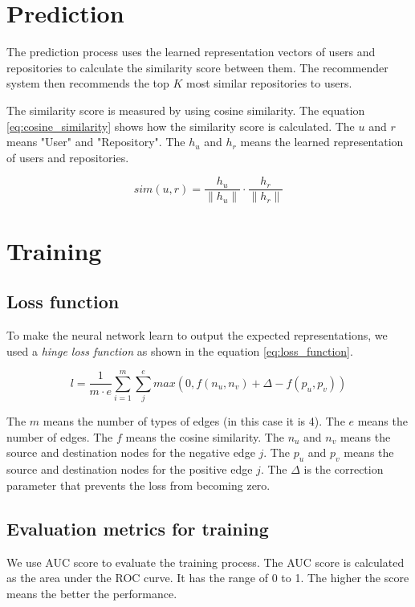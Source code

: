 \documentclass[11pt,twoside]{report}
\begin{document}
\section{Prediction}
The prediction process uses the learned representation vectors of users and repositories to calculate the similarity score between them. The recommender system then recommends the top $K$ most similar repositories to users.

The similarity score is measured by using cosine similarity. The equation \ref{eq:cosine_similarity} shows how the similarity score is calculated. The $u$ and $r$ means "User" and "Repository". The $h_u$ and $h_r$ means the learned representation of users and repositories.

\begin{equation}
    sim(u, r) = \frac{h_u}{\|h_u\|}\cdot\frac{h_r}{\|h_r\|}
    \label{eq:cosine_similarity}
\end{equation}

\section{Training}
\subsection{Loss function}
To make the neural network learn to output the expected representations, we used a \textit{hinge loss function} as shown in the equation \ref{eq:loss_function}.

\begin{equation}
    l=\frac{1}{m\cdot{e}}\sum_{i=1}^{m}\sum_{j}^{e} max(0, f(n_u, n_v)+\Delta-f(p_u, p_v))
    \label{eq:loss_function}
\end{equation}

The $m$ means the number of types of edges (in this case it is 4). The $e$ means the number of edges. The $f$ means the cosine similarity. The $n_u$ and $n_v$ means the source and destination nodes for the negative edge $j$. The $p_u$ and $p_v$ means the source and destination nodes for the positive edge $j$. The $\Delta$ is the correction parameter that prevents the loss from becoming zero.

\subsection{Evaluation metrics for training}
We use AUC score to evaluate the training process. The AUC score is calculated as the area under the ROC curve. It has the range of 0 to 1. The higher the score means the better the performance.
\end{document}
